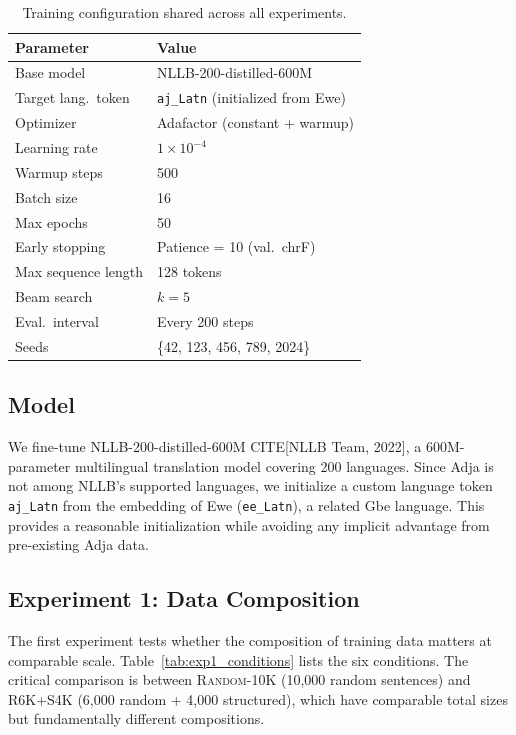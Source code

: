\documentclass[11pt]{article}
\begin{document}
\begin{table}[t]
\centering
\small
\caption{Training configuration shared across all experiments.}
\label{tab:hyperparams}
\begin{tabular}{ll}
\toprule
\textbf{Parameter} & \textbf{Value} \\
\midrule
Base model         & NLLB-200-distilled-600M \\
Target lang.\ token & \texttt{aj\_Latn} (initialized from Ewe) \\
Optimizer          & Adafactor (constant + warmup) \\
Learning rate      & $1 \times 10^{-4}$ \\
Warmup steps       & 500 \\
Batch size         & 16 \\
Max epochs         & 50 \\
Early stopping     & Patience = 10 (val.\ chrF) \\
Max sequence length & 128 tokens \\
Beam search        & $k = 5$ \\
Eval.\ interval    & Every 200 steps \\
Seeds              & \{42, 123, 456, 789, 2024\} \\
\bottomrule
\end{tabular}
\end{table}

\subsection{Model}

We fine-tune NLLB-200-distilled-600M CITE[NLLB Team, 2022], a 600M-parameter multilingual translation model covering 200 languages. Since Adja is not among NLLB's supported languages, we initialize a custom language token \texttt{aj\_Latn} from the embedding of Ewe (\texttt{ee\_Latn}), a related Gbe language. This provides a reasonable initialization while avoiding any implicit advantage from pre-existing Adja data.

\subsection{Experiment 1: Data Composition}

The first experiment tests whether the composition of training data matters at comparable scale. Table~\ref{tab:exp1_conditions} lists the six conditions. The critical comparison is between \textsc{Random-10K} (10,000 random sentences) and \textsc{R6K+S4K} (6,000 random + 4,000 structured), which have comparable total sizes but fundamentally different compositions.
\end{document}
